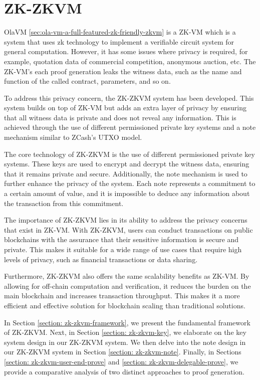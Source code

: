 \section{ZK-ZKVM} \label{sec:zk-zkvm}

OlaVM \ref{sec:ola-vm-a-full-featured-zk-friendly-zkvm} is a ZK-VM which is a system that uses zk technology to implement a verifiable circuit system for general computation. However, it has some issues where privacy is required, for example, quotation data of commercial competition, anonymous auction, etc. The ZK-VM's each proof generation leaks the witness data, such as the name and function of the called contract, parameters, and so on.

To address this privacy concern, the ZK-ZKVM system has been developed. This system builds on top of ZK-VM but adds an extra layer of privacy by ensuring that all witness data is private and does not reveal any information. This is achieved through the use of different permissioned private key systems and a note mechanism similar to ZCash's UTXO model.

The core technology of ZK-ZKVM is the use of different permissioned private key systems. These keys are used to encrypt and decrypt the witness data, ensuring that it remains private and secure. Additionally, the note mechanism is used to further enhance the privacy of the system. Each note represents a commitment to a certain amount of value, and it is impossible to deduce any information about the transaction from this commitment.

The importance of ZK-ZKVM lies in its ability to address the privacy concerns that exist in ZK-VM. With ZK-ZKVM, users can conduct transactions on public blockchains with the assurance that their sensitive information is secure and private. This makes it suitable for a wide range of use cases that require high levels of privacy, such as financial transactions or data sharing.

Furthermore, ZK-ZKVM also offers the same scalability benefits as ZK-VM. By allowing for off-chain computation and verification, it reduces the burden on the main blockchain and increases transaction throughput. This makes it a more efficient and effective solution for blockchain scaling than traditional solutions.

In Section \ref{section: zk-zkvm-framework}, we present the fundamental framework of ZK-ZKVM. Next, in Section \ref{section: zk-zkvm-key}, we elaborate on the key system design in our ZK-ZKVM system. We then delve into the note design in our ZK-ZKVM system in Section \ref{section: zk-zkvm-note}. Finally, in Sections \ref{section: zk-zkvm-user-end-prove} and \ref{section: zk-zkvm-delegable-prove}, we provide a comparative analysis of two distinct approaches to proof generation.





